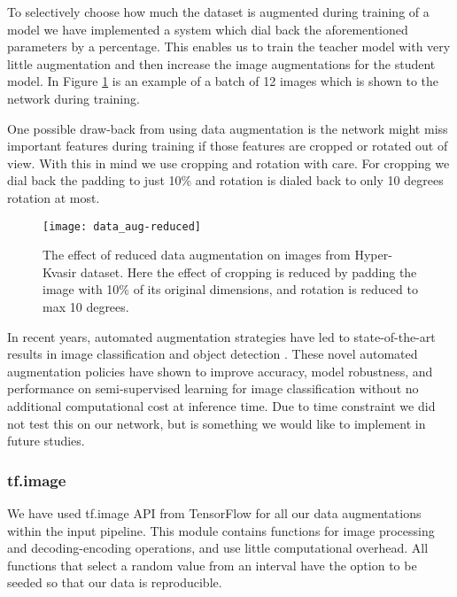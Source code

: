 \documentclass[thesis.tex]{subfiles}
\begin{document}
To selectively choose how much the dataset is augmented during training of a model we have implemented a system which dial back the aforementioned parameters by a percentage. This enables us to train the teacher model with very little augmentation and then increase the image augmentations for the student model. In Figure \ref{fig:data_aug-reduced} is an example of a batch of 12 images which is shown to the network during training.

One possible draw-back from using data augmentation is the network might miss important features during training if those features are cropped or rotated out of view. With this in mind we use cropping and rotation with care. For cropping we dial back the padding to just 10\% and rotation is dialed back to only 10 degrees rotation at most.

\begin{figure} %
  \begin{center}
    \texttt{[image: data\_aug-reduced]}
    \caption[The effect of reduced data augmentation on sample image.]{The effect of reduced data augmentation on images from Hyper-Kvasir dataset. Here the effect of cropping is reduced by padding the image with 10\% of its original dimensions, and rotation is reduced to max 10 degrees.}
    \label{fig:data_aug-reduced}
  \end{center}
\end{figure}

In recent years, automated augmentation strategies have led to state-of-the-art results in image classification and object detection \cite{AutoAugmentLearning19, RandAugmentPractical19}. These novel automated augmentation policies have shown to improve accuracy, model robustness, and performance on semi-supervised learning for image classification without no additional computational cost at inference time. Due to time constraint we did not test this on our network, but is something we would like to implement in future studies.



\subsubsection{tf.image}
We have used tf.image API from TensorFlow for all our data augmentations within the input pipeline. This module contains functions for image processing and decoding-encoding operations, and use little computational overhead. All functions that select a random value from an interval have the option to be seeded so that our data is reproducible.
\end{document}

